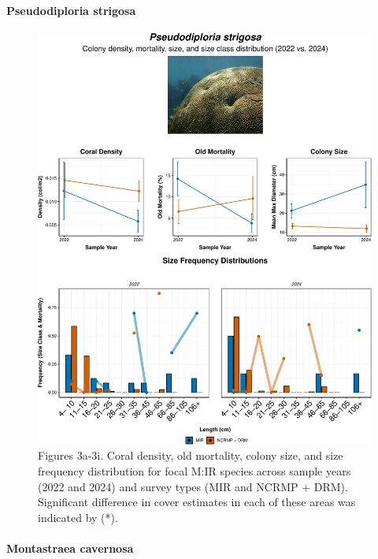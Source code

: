 \documentclass[
]{article}
\let\oldparagraph\paragraph
\renewcommand{\paragraph}[1]{\oldparagraph{#1}\mbox{}}
\begin{document}
\hypertarget{pseudodiploria-strigosa}{%
\paragraph{\texorpdfstring{ Pseudodiploria strigosa
}{ Pseudodiploria strigosa }}\label{pseudodiploria-strigosa}}

\begin{figure}

{\centering \includegraphics{MIR_quarto_files/figure-pdf/coral-tabyss-8.pdf}

}

\caption{Figures 3a-3i. Coral density, old mortality, colony size, and
size frequency distribution for focal M:IR species across sample years
(2022 and 2024) and survey types (MIR and NCRMP + DRM). Significant
difference in cover estimates in each of these areas was indicated by
(*).}

\end{figure}

\hypertarget{montastraea-cavernosa}{%
\paragraph{\texorpdfstring{ Montastraea cavernosa
}{ Montastraea cavernosa }}\label{montastraea-cavernosa}}
\end{document}
